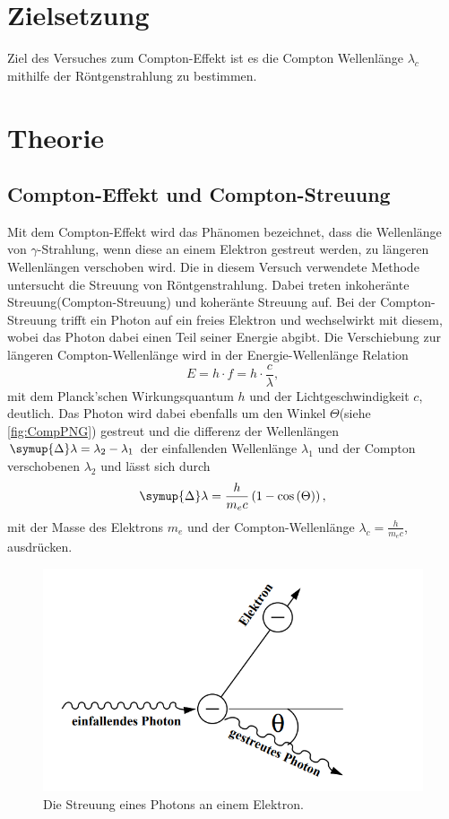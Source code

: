 \section{Zielsetzung}
\label{sec:Zielsetzung}
Ziel des Versuches zum Compton-Effekt ist es die Compton Wellenlänge $\lambda_c$ mithilfe der Röntgenstrahlung zu bestimmen.
\section{Theorie}
\label{sec:Theorie}
\subsection{Compton-Effekt und Compton-Streuung}
Mit dem Compton-Effekt wird das Phänomen bezeichnet, dass die Wellenlänge von $\gamma$-Strahlung, wenn diese an einem Elektron gestreut werden,
zu längeren Wellenlängen verschoben wird. Die in diesem Versuch verwendete Methode untersucht die Streuung von Röntgenstrahlung. Dabei treten
inkoheränte Streuung(Compton-Streuung) und koheränte Streuung auf. Bei der Compton-Streuung trifft ein Photon auf ein freies Elektron und wechselwirkt
mit diesem, wobei das Photon dabei einen Teil seiner Energie abgibt. Die Verschiebung zur längeren Compton-Wellenlänge wird in der
Energie-Wellenlänge Relation
\begin{equation}
    \label{eqn:EHF}
    E = h\cdot f = h\cdot\frac{c}{\lambda},
\end{equation}
mit dem Planck'schen Wirkungsquantum $h$ und der Lichtgeschwindigkeit $c$, deutlich.\cite{Gerth}
Das Photon wird dabei ebenfalls um den Winkel $\Theta$(siehe \autoref{fig:CompPNG}) gestreut und die differenz der Wellenlängen $\symup{\Delta} \lambda = \lambda_2 - \lambda_1$
der einfallenden Wellenlänge $\lambda_1$ und der Compton verschobenen $\lambda_2$ und lässt sich durch
\begin{equation}
    \symup{\Delta}\lambda = \frac{h}{m_ec}\left(1-\cos\left(\Theta\right)\right),
\end{equation}
mit der Masse des Elektrons $m_e$ und der Compton-Wellenlänge $\lambda_c = \frac{h}{m_ec}$, ausdrücken.
\begin{figure}[H]
    \centering
    \includegraphics[scale=0.8]{content/Compton-Effekt.png}
    \caption{Die Streuung eines Photons an einem Elektron.\cite{sample}}
    \label{fig:CompPNG}
\end{figure}
